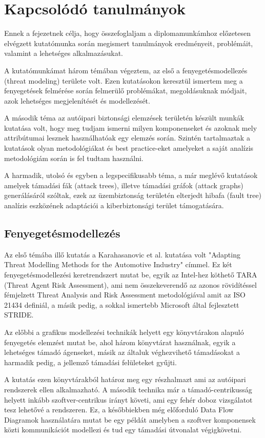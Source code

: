 \chapter{Kapcsolódó tanulmányok}
Ennek a fejezetnek célja, hogy összefoglaljam a diplomamunkámhoz előzetesen elvégzett kutatómunka során megismert tanulmányok eredményeit, problémáit, valamint a lehetséges alkalmazásukat.

A kutatómunkámat három témában végeztem, az első a fenyegetésmodellezés (threat modeling) területe volt. Ezen kutatásokon keresztül ismertem meg a fenyegetések felmérése során felmerülő problémákat, megoldásuknak módjait, azok lehetséges megjelenítését és modellezését.

A második téma az autóipari biztonsági elemzések területén készült munkák kutatása volt, hogy meg tudjam ismerni milyen komponenseket és azoknak mely attribútumai lesznek használhatóak egy elemzés során. Szintén tartalmaztak a kutatások olyan metodológiákat és best practice-eket amelyeket a saját analízis metodológiám során is fel tudtam használni.

A harmadik, utolsó és egyben a legspecifikusabb téma, a már meglévő kutatások amelyek támadási fák (attack trees), illetve támadási gráfok (attack graphs) generálásáról szóltak, ezek az üzembiztonság területén elterjedt hibafa (fault tree) analízis eszközének adaptációi a kiberbiztonsági terület támogatására.

\section{Fenyegetésmodellezés}

Az első témába illő kutatás a Karahasanovic et al.\cite{Karahasanovic} kutatása volt "Adapting Threat Modelling Methods for the Automotive Industry" címmel. Ez két fenyegetésmodellezési keretrendszert mutat be, egyik az Intel-hez köthető TARA (Threat Agent Risk Assessment), ami nem összekeverendő az azonos rövidítéssel fémjelzett Threat Analysis and Risk Assessment metodológiával amit az ISO 21434 definiál, a másik pedig, a sokkal ismertebb Microsoft által fejlesztett STRIDE. 

Az előbbi a grafikus modellezési technikák helyett egy könyvtárakon alapuló fenyegetés elemzést mutat be, ahol három könyvtárat használnak, egyik a lehetséges támadó ágenseket, másik az általuk véghezvihető támadásokat a harmadik pedig, a jellemző támadási felületeket gyűjti. 

A kutatás ezen könyvtárakból határoz meg egy részhalmazt ami az autóipari rendszerek ellen alkalmazható. A második technika már a támadó-centrikusság helyett inkább szoftver-centrikus irányt követi, ami egy fehér doboz vizsgálatot tesz lehetővé a rendszeren. Ez, a későbbiekben még előforduló Data Flow Diagramok használatára mutat be egy példát amelyben a szoftver komponensek közti kommunikációt modellezi és tud egy támadási útvonalat végigkövetni. 

